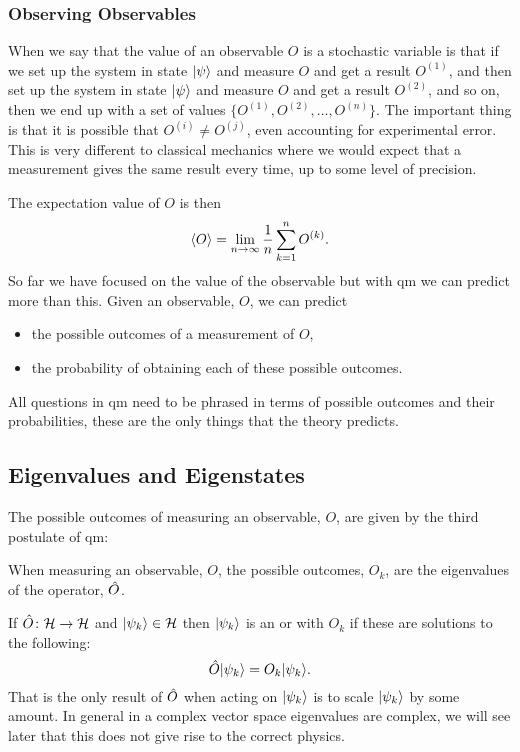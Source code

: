     \subsubsection{Observing Observables}
    When we say that the value of an observable \(O\) is a stochastic variable is that if we set up the system in state \(\vert {\psi} \rangle\) and measure \(O\) and get a result \(O^{(1)}\), and then set up the system in state \(\vert {\psi} \rangle\) and measure \(O\) and get a result \(O^{(2)}\), and so on, then we end up with a set of values \(\{O^{(1)}, O^{(2)}, \dotsc, O^{(n)}\}\).
    The important thing is that it is possible that \(O^{(i)}\ne O^{(j)}\), even accounting for experimental error.
    This is very different to classical mechanics where we would expect that a measurement gives the same result every time, up to some level of precision.
    
    The expectation value of \(O\) is then
    \[\langle{O}\rangle = \lim_{n\to\infty} \frac{1}{n}\sum_{k=1}^{n} O^{(k)}.\]
    So far we have focused on the value of the observable but with \acrshort{qm} we can predict more than this.
    Given an observable, \(O\), we can predict
    \begin{itemize}
        \item the possible outcomes of a measurement of \(O\),
        \item the probability of obtaining each of these possible outcomes.
    \end{itemize}
    All questions in \acrshort{qm} need to be phrased in terms of possible outcomes and their probabilities, these are the only things that the theory predicts.
    
    \subsection{Eigenvalues and Eigenstates}
    The possible outcomes of measuring an observable, \(O\), are given by the third postulate of \acrshort{qm}:
    \begin{postulate}{}{}
        When measuring an observable, \(O\), the possible outcomes, \(O_k\), are the eigenvalues of the operator, \(\hat{O}\).
    \end{postulate}
    If \(\hat{O}\colon\mathcal{H}\to\mathcal{H}\) and \(\vert {\psi_k} \rangle\in\mathcal{H}\) then \(\vert {\psi_k} \rangle\) is an  or  with  \(O_k\) if these are solutions to the following:
    \[\hat{O}\vert {\psi_k} \rangle = O_k\vert {\psi_k} \rangle.\]
    That is the only result of \(\hat{O}\) when acting on \(\vert {\psi_k} \rangle\) is to scale \(\vert {\psi_k} \rangle\) by some amount.
    In general in a complex vector space eigenvalues are complex, we will see later that this does not give rise to the correct physics.
    

